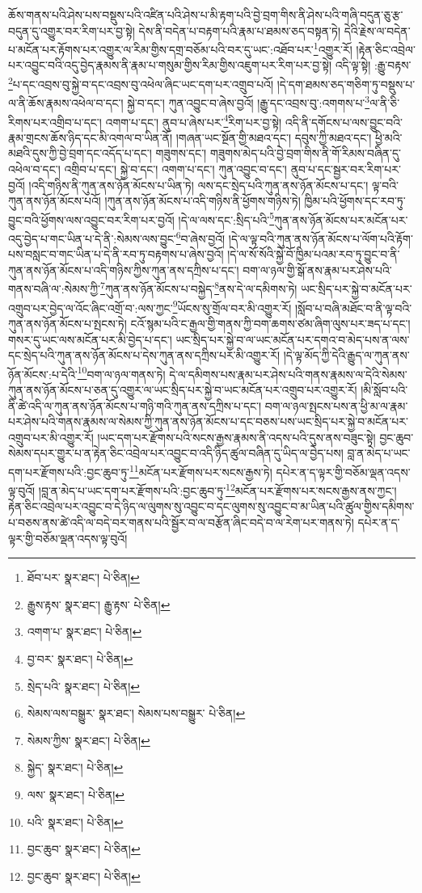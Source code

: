 ཆོས་གནས་པའི་ཤེས་པས་བསྡུས་པའི་འཛིན་པའི་ཤེས་པ་མི་རྟག་པའི་བྱེ་བྲག་གིས་ནི་ཤེས་པའི་གཞི་བདུན་ཅུ་རྩ་བདུན་དུ་འགྱུར་བར་རིག་པར་བྱ་སྟེ། དེས་ནི་བདེན་པ་བརྟག་པའི་རྣམ་པ་ཐམས་ཅད་བསྟན་ཏེ། དེའི་རྗེས་ལ་བདེན་པ་མངོན་པར་རྟོགས་པར་འགྱུར་ལ་རིམ་གྱིས་དགྲ་བཅོམ་པའི་བར་དུ་ཡང་:འཐོབ་པར་\footnote{ཐོབ་པར་  སྣར་ཐང་།  པེ་ཅིན། }འགྱུར་རོ། །རྟེན་ཅིང་འབྲེལ་པར་འབྱུང་བའི་འདུ་བྱེད་རྣམས་ནི་རྣམ་པ་གསུམ་གྱིས་རིམ་གྱིས་འཇུག་པར་རིག་པར་བྱ་སྟེ། འདི་ལྟ་སྟེ། :རྒྱུ་བརྟས་\footnote{རྒྱུས་རྟས་  སྣར་ཐང་། རྒྱུ་རྟས་  པེ་ཅིན། }པ་དང་འབྲས་བུ་སྐྱེ་བ་དང་འབྲས་བུ་འཕེལ་ཞིང་ཡང་དག་པར་འགྲུབ་པའོ། །དེ་དག་ཐམས་ཅད་གཅིག་ཏུ་བསྡུས་པ་ལ་ནི་ཆོས་རྣམས་འཕེལ་བ་དང་། སྐྱེ་བ་དང་། ཀུན་འབྱུང་བ་ཞེས་བྱའོ། །རྒྱུ་དང་འབྲས་བུ་:འགགས་པ་\footnote{འགག་པ་  སྣར་ཐང་།  པེ་ཅིན། }ལ་ནི་ཅི་རིགས་པར་འགྲིབ་པ་དང་། འགག་པ་དང་། ནུབ་པ་ཞེས་པར་\footnote{བྱ་བར་  སྣར་ཐང་།  པེ་ཅིན། }རིག་པར་བྱ་སྟེ། འདི་ནི་དགོངས་པ་ལས་བྱུང་བའི་རྣམ་གྲངས་ཆོས་ཉིད་དང་མི་འགལ་བ་ཡིན་ནོ། །གཞན་ཡང་སྔོན་གྱི་མཐའ་དང་། དབུས་ཀྱི་མཐའ་དང་། ཕྱི་མའི་མཐའི་དུས་ཀྱི་བྱེ་བྲག་དང་འདོད་པ་དང་། གཟུགས་དང་། གཟུགས་མེད་པའི་བྱེ་བྲག་གིས་ནི་གོ་རིམས་བཞིན་དུ་འཕེལ་བ་དང་། འགྲིབ་པ་དང་། སྐྱེ་བ་དང་། འགག་པ་དང་། ཀུན་འབྱུང་བ་དང་། ནུབ་པ་དང་སྦྱར་བར་རིག་པར་བྱའོ། །འདི་གཉིས་ནི་ཀུན་ནས་ཉོན་མོངས་པ་ཡིན་ཏེ། ལས་དང་སྲེད་པའི་ཀུན་ནས་ཉོན་མོངས་པ་དང་། ལྟ་བའི་ཀུན་ནས་ཉོན་མོངས་པའོ། །ཀུན་ནས་ཉོན་མོངས་པ་འདི་གཉིས་ནི་ཕྱོགས་གཉིས་ཏེ། ཁྱིམ་པའི་ཕྱོགས་དང་རབ་ཏུ་བྱུང་བའི་ཕྱོགས་ལས་འབྱུང་བར་རིག་པར་བྱའོ། །དེ་ལ་ལས་དང་:སྲིད་པའི་\footnote{སྲེད་པའི་  སྣར་ཐང་།  པེ་ཅིན། }ཀུན་ནས་ཉོན་མོངས་པར་མངོན་པར་འདུ་བྱེད་པ་གང་ཡིན་པ་དེ་ནི་:སེམས་ལས་བྱུང་\footnote{སེམས་ལས་བསྒྱུར་  སྣར་ཐང་། སེམས་པས་བསྒྱུར་  པེ་ཅིན། }བ་ཞེས་བྱའོ། །དེ་ལ་ལྟ་བའི་ཀུན་ནས་ཉོན་མོངས་པ་ལོག་པའི་རྟོག་པས་བསླང་བ་གང་ཡིན་པ་དེ་ནི་རབ་ཏུ་བརྟགས་པ་ཞེས་བྱའོ། །དེ་ལ་སོ་སོའི་སྐྱེ་བོ་ཁྱིམ་པའམ་རབ་ཏུ་བྱུང་བ་ནི་ཀུན་ནས་ཉོན་མོངས་པ་འདི་གཉིས་ཀྱིས་ཀུན་ནས་དཀྲིས་པ་དང་། བག་ལ་ཉལ་གྱི་སྒོ་ནས་རྣམ་པར་ཤེས་པའི་གནས་བཞི་ལ་:སེམས་ཀྱི་\footnote{སེམས་ཀྱིས་  སྣར་ཐང་།  པེ་ཅིན། }ཀུན་ནས་ཉོན་མོངས་པ་བསྐྱེད་\footnote{སྐྱེད་  སྣར་ཐང་།  པེ་ཅིན། }ནས་དེ་ལ་དམིགས་ཏེ། ཡང་སྲིད་པར་སྐྱེ་བ་མངོན་པར་འགྲུབ་པར་བྱེད་ལ་འོང་ཞིང་འགྲོ་བ་:ལས་ཀྱང་\footnote{ལས་  སྣར་ཐང་།  པེ་ཅིན། }ཡོངས་སུ་གྲོལ་བར་མི་འགྱུར་རོ། །སློབ་པ་བཞི་མཐོང་བ་ནི་ལྟ་བའི་ཀུན་ནས་ཉོན་མོངས་པ་སྤངས་ཏེ། ངའོ་སྙམ་པའི་ང་རྒྱལ་གྱི་གནས་ཀྱི་བག་ཆགས་ཙམ་ཞིག་ལུས་པར་ཟད་པ་དང་། གསར་དུ་ཡང་ལས་མངོན་པར་མི་བྱེད་པ་དང་། ཡང་སྲིད་པར་སྐྱེ་བ་ལ་ཡང་མངོན་པར་དགའ་བ་མེད་པས་ན་ལས་དང་སྲེད་པའི་ཀུན་ནས་ཉོན་མོངས་པ་དེས་ཀུན་ནས་དཀྲིས་པར་མི་འགྱུར་རོ། །དེ་ལྟ་མོད་ཀྱི་དེའི་རྒྱུད་ལ་ཀུན་ནས་ཉོན་མོངས་:པ་དེའི་\footnote{པའི་  སྣར་ཐང་།  པེ་ཅིན། }བག་ལ་ཉལ་གནས་ཏེ། དེ་ལ་དམིགས་པས་རྣམ་པར་ཤེས་པའི་གནས་རྣམས་ལ་དེའི་སེམས་ཀུན་ནས་ཉོན་མོངས་པ་ཅན་དུ་འགྱུར་ལ་ཡང་སྲིད་པར་སྐྱེ་བ་ཡང་མངོན་པར་འགྲུབ་པར་འགྱུར་རོ། །མི་སློབ་པའི་ནི་ཚེ་འདི་ལ་ཀུན་ནས་ཉོན་མོངས་པ་གཉི་གའི་ཀུན་ནས་དཀྲིས་པ་དང་། བག་ལ་ཉལ་སྤངས་པས་ན་ཕྱི་མ་ལ་རྣམ་པར་ཤེས་པའི་གནས་རྣམས་ལ་སེམས་ཀྱི་ཀུན་ནས་ཉོན་མོངས་པ་དང་བཅས་པས་ཡང་སྲིད་པར་སྐྱེ་བ་མངོན་པར་འགྲུབ་པར་མི་འགྱུར་རོ། །ཡང་དག་པར་རྫོགས་པའི་སངས་རྒྱས་རྣམས་ནི་འདས་པའི་དུས་ནས་བཟུང་སྟེ། བྱང་ཆུབ་སེམས་དཔར་གྱུར་པ་ན་རྟེན་ཅིང་འབྲེལ་པར་འབྱུང་བ་འདི་ཉིད་ཚུལ་བཞིན་དུ་ཡིད་ལ་བྱེད་པས། བླ་ན་མེད་པ་ཡང་དག་པར་རྫོགས་པའི་:བྱང་ཆུབ་ཏུ་\footnote{བྱང་ཆུབ་  སྣར་ཐང་།  པེ་ཅིན། }མངོན་པར་རྫོགས་པར་སངས་རྒྱས་ཏེ། དཔེར་ན་ད་ལྟར་གྱི་བཅོམ་ལྡན་འདས་ལྟ་བུའོ། །བླ་ན་མེད་པ་ཡང་དག་པར་རྫོགས་པའི་:བྱང་ཆུབ་ཏུ་\footnote{བྱང་ཆུབ་  སྣར་ཐང་།  པེ་ཅིན། }མངོན་པར་རྫོགས་པར་སངས་རྒྱས་ནས་ཀྱང་། རྟེན་ཅིང་འབྲེལ་པར་འབྱུང་བ་དེ་ཉིད་ལ་ལུགས་སུ་འབྱུང་བ་དང་ལུགས་སུ་འབྱུང་བ་མ་ཡིན་པའི་ཚུལ་གྱིས་དམིགས་པ་བཅས་ནས་ཚེ་འདི་ལ་བདེ་བར་གནས་པའི་སྦྱོར་བ་ལ་བརྩོན་ཞིང་བདེ་བ་ལ་རེག་པར་གནས་ཏེ། དཔེར་ན་ད་ལྟར་གྱི་བཅོམ་ལྡན་འདས་ལྟ་བུའོ། 